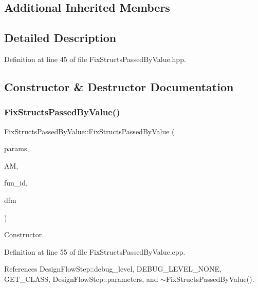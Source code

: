\subsection*{Additional Inherited Members}


\subsection{Detailed Description}


Definition at line 45 of file Fix\+Structs\+Passed\+By\+Value.\+hpp.



\subsection{Constructor \& Destructor Documentation}
\mbox{\label{classFixStructsPassedByValue_af23bf72c70aa5551ee14d7d77716a631}} 
\subsubsection{\texorpdfstring{Fix\+Structs\+Passed\+By\+Value()}{FixStructsPassedByValue()}}
{\footnotesize\ttfamily Fix\+Structs\+Passed\+By\+Value\+::\+Fix\+Structs\+Passed\+By\+Value (\begin{DoxyParamCaption}\item[{const \hyperlink{Parameter_8hpp_a37841774a6fcb479b597fdf8955eb4ea}{Parameter\+Const\+Ref}}]{params,  }\item[{const \hyperlink{application__manager_8hpp_a04ccad4e5ee401e8934306672082c180}{application\+\_\+manager\+Ref}}]{AM,  }\item[{unsigned int}]{fun\+\_\+id,  }\item[{const Design\+Flow\+Manager\+Const\+Ref}]{dfm }\end{DoxyParamCaption})}



Constructor. 



Definition at line 55 of file Fix\+Structs\+Passed\+By\+Value.\+cpp.



References Design\+Flow\+Step\+::debug\+\_\+level, D\+E\+B\+U\+G\+\_\+\+L\+E\+V\+E\+L\+\_\+\+N\+O\+NE, G\+E\+T\+\_\+\+C\+L\+A\+SS, Design\+Flow\+Step\+::parameters, and $\sim$\+Fix\+Structs\+Passed\+By\+Value().

